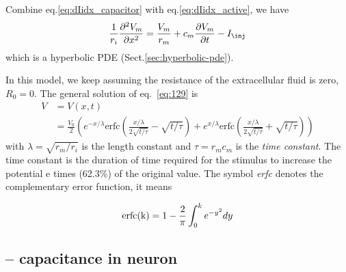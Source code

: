 Combine eq.\ref{eq:dIidx_capacitor} with eq.\ref{eq:dIidx_active}, we
have
\begin{equation}
  \label{eq:129}
  \frac{1}{r_i} \frac{\partial ^2V_m}{\partial x^2} = 
  \frac{V_m}{r_m} + c_m
  \frac{\partial V_m}{\partial t} - I_\inj
\end{equation}
which is a hyperbolic PDE (Sect.\ref{sec:hyperbolic-pde}).

\begin{mdframed}[linecolor=red!60!black,  linewidth=2pt]
In this model, we keep assuming the resistance of
the extracellular fluid is zero, $R_0 = 0$.
The general solution of eq.~\eqref{eq:129} is
\begin{equation}\label{eq:Vxt}
\begin{split}
  V &= V(x,t) \\ 
   &= \frac{V_0}{2}\left( e^{-x/\lambda}
    \text{erfc}(\frac{x/\lambda}{2\sqrt{t/\tau}}-\sqrt{t/\tau}) + e^{x/\lambda} \text{erfc}(\frac{x/\lambda}{2\sqrt{t/\tau}}+\sqrt{t/\tau}) \right)
\end{split}
\end{equation}
with $\lambda = \sqrt{r_m/r_i}$ is the length constant and 
$\tau =r_mc_m$ is the {\it time constant}. The time constant is the
  duration of time required for the stimulus to increase the potential
  e times (62.3\%) of the original value. The symbol {\it erfc} denotes the
complementary error function, it means

\begin{equation}
  \label{eq:130}
     \text{erfc(k)}= 1 -
  \frac{2}{\pi}
  \int_0^{k} e^{-y^2} dy
  \\
\end{equation}

\end{mdframed}

\subsection{-- capacitance in neuron}
\label{sec:capacitance-in-neurons}

